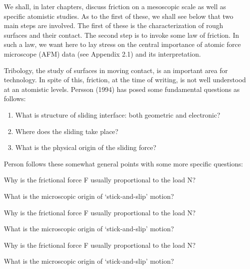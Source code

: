 We shall, in later chapters, discuss friction on a mesoscopic scale 
as well as specific atomistic studies. As to the first of these, we 
shall see below that two main steps are involved. The first of these 
is the characterization of rough surfaces and their contact. The 
second step is to invoke some law of friction. In such a law, we 
want here to lay stress on the central importance of atomic force 
microscope (AFM) data (see Appendix 2.1) and its interpretation.

Tribology, the study of surfaces in moving contact, is an important 
area for technology. In spite of this, friction, at the time of 
writing, is not well understood at an atomistic levels. Persson 
(1994) has posed some fundamental questions as follows:
\begin{enumerate}
\item%
What is structure of sliding interface: both geometric and 
electronic?

\item%
Where does the sliding take place?

\item%
What is the physical origin of the sliding force?
\end{enumerate}

Person follows these somewhat general points with some more specific 
questions:

\begin{romanlist}
\item%
Why is the frictional force F usually proportional to the load N?

\item%
What is the microscopic origin of `stick-and-slip' motion?
\item%
Why is the frictional force F usually proportional to the load N?

\item%
What is the microscopic origin of `stick-and-slip' motion?
\item%
Why is the frictional force F usually proportional to the load N?

\item%
What is the microscopic origin of `stick-and-slip' motion?
\end{romanlist}

